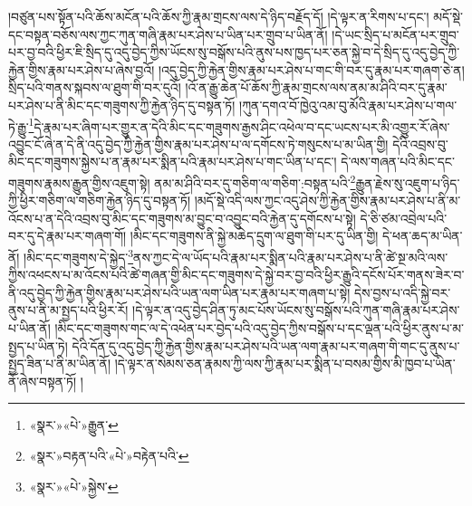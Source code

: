 །བཙུན་པས་སྟོན་པའི་ཆོས་མངོན་པའི་ཆོས་ཀྱི་རྣམ་གྲངས་ལས་དེ་ཉིད་བརྗོད་དོ། །དེ་ལྟར་ན་རིགས་པ་དང་། མདོ་སྡེ་དང་བསྟན་བཅོས་ལས་ཀྱང་ཀུན་གཞི་རྣམ་པར་ཤེས་པ་ཡིན་པར་གྲུབ་པ་ཡིན་ནོ། །དེ་ཡང་སྲིད་པ་མངོན་པར་གྲུབ་པར་བྱ་བའི་ཕྱིར་ཇི་སྲིད་དུ་འདུ་བྱེད་ཀྱིས་ཡོངས་སུ་བསྒོས་པའི་ནུས་པས་ཁྱད་པར་ཅན་སྐྱེ་བ་དེ་སྲིད་དུ་འདུ་བྱེད་ཀྱི་རྐྱེན་གྱིས་རྣམ་པར་ཤེས་པ་ཞེས་བྱའོ། །འདུ་བྱེད་ཀྱི་རྐྱེན་གྱིས་རྣམ་པར་ཤེས་པ་གང་གི་བར་དུ་རྣམ་པར་གཞག་ཅེ་ན། སྲིད་པའི་གནས་སྐབས་ལ་ཐུག་གི་བར་དུའོ། །འོ་ན་རྒྱུ་ཆེན་པོ་ཆོས་ཀྱི་རྣམ་གྲངས་ལས་ནམ་མ་ཤིའི་བར་དུ་རྣམ་པར་ཤེས་པ་ནི་མིང་དང་གཟུགས་ཀྱི་རྐྱེན་ཉིད་དུ་བསྟན་ཏོ། །ཀུན་དགའ་བོ་ཁྱེའུ་འམ་བུ་མོའི་རྣམ་པར་ཤེས་པ་གལ་ཏེ་རྒྱུ་\footnote{«སྣར་»«པེ་»རྒྱུན་}དེ་རྣམ་པར་ཞིག་པར་གྱུར་ན་དེའི་མིང་དང་གཟུགས་རྒྱས་ཤིང་འཕེལ་བ་དང་ཡངས་པར་མི་འགྱུར་རོ་ཞེས་འབྱུང་ངོ་ཞེ་ན་དེ་ནི་འདུ་བྱེད་ཀྱི་རྐྱེན་གྱིས་རྣམ་པར་ཤེས་པ་ལ་དགོངས་ཏེ་གསུངས་པ་མ་ཡིན་གྱི། དེའི་འབྲས་བུ་མིང་དང་གཟུགས་སྐྱེས་པ་ན་རྣམ་པར་སྨིན་པའི་རྣམ་པར་ཤེས་པ་གང་ཡིན་པ་དང་། དེ་ལས་གཞན་པའི་མིང་དང་གཟུགས་རྣམས་རྒྱུན་གྱིས་འཇུག་སྟེ། ནམ་མ་ཤིའི་བར་དུ་གཅིག་ལ་གཅིག་:བསྟན་པའི་\footnote{«སྣར་»བརྟན་པའི་«པེ་»བརྟེན་པའི་}རྒྱུན་རྗེས་སུ་འཇུག་པ་ཉིད་ཀྱི་ཕྱིར་གཅིག་ལ་གཅིག་རྐྱེན་ཉིད་དུ་བསྟན་ཏོ། །མདོ་སྡེ་འདི་ལས་ཀྱང་འདུ་ཤེས་ཀྱི་རྐྱེན་གྱིས་རྣམ་པར་ཤེས་པ་ནི་མ་འོངས་པ་ན་དེའི་འབྲས་བུ་མིང་དང་གཟུགས་མ་བྱུང་བ་འབྱུང་བའི་རྐྱེན་དུ་དགོངས་པ་སྟེ། དེ་ཅི་ཙམ་འབྲེལ་པའི་བར་དུ་དེ་རྣམ་པར་གཞག་གོ། །མིང་དང་གཟུགས་ནི་སྐྱེ་མཆེད་དྲུག་ལ་ཐུག་གི་པར་དུ་ཡིན་གྱི། དེ་ཕན་ཆད་མ་ཡིན་ནོ། །མིང་དང་གཟུགས་དེ་སྐྱེད་\footnote{«སྣར་»«པེ་»སྐྱེས་}ནས་ཀྱང་དེ་ལ་ཡོད་པའི་རྣམ་པར་སྨིན་པའི་རྣམ་པར་ཤེས་པ་ནི་ཚེ་སྔ་མའི་ལས་ཀྱིས་འཕངས་པ་མ་འོངས་པའི་ཚེ་གཞན་གྱི་མིང་དང་གཟུགས་དེ་སྐྱེ་བར་བྱ་བའི་ཕྱིར་རྒྱུའི་དངོས་པོར་གནས་ཟེར་བ་ནི་འདུ་བྱེད་ཀྱི་རྐྱེན་གྱིས་རྣམ་པར་ཤེས་པའི་ཡན་ལག་ཡིན་པར་རྣམ་པར་གཞག་པ་སྟེ། དེས་བྱས་པ་འདི་སྐྱེ་བར་ནུས་པ་ནི་མ་སྤྱད་པའི་ཕྱིར་རོ། །དེ་ལྟར་ན་འདུ་བྱེད་ཤིན་ཏུ་མང་པོས་ཡོངས་སུ་བསྒོས་པའི་ཀུན་གཞི་རྣམ་པར་ཤེས་པ་ཡིན་ནོ། །མིང་དང་གཟུགས་གང་ལ་དེ་འཕེན་པར་བྱེད་པའི་འདུ་བྱེད་ཀྱིས་བསྒོས་པ་དང་ལྡན་པའི་ཕྱིར་ནུས་པ་མ་སྤྱད་པ་ཡིན་ཏེ། དེའི་དོན་དུ་འདུ་བྱེད་ཀྱི་རྐྱེན་གྱིས་རྣམ་པར་ཤེས་པའི་ཡན་ལག་རྣམ་པར་གཞག་གི་གང་དུ་ནུས་པ་སྤྱད་ཟིན་པ་ནི་མ་ཡིན་ནོ། །དེ་ལྟར་ན་སེམས་ཅན་རྣམས་ཀྱི་ལས་ཀྱི་རྣམ་པར་སྨིན་པ་བསམ་གྱིས་མི་ཁྱབ་པ་ཡིན་ནོ་ཞེས་བསྟན་ཏོ། །
